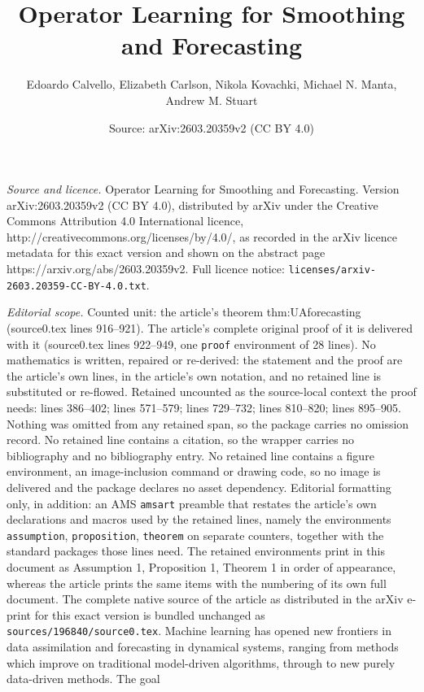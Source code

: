 \documentclass[10pt,a4paper]{amsart}
\title{Operator Learning for Smoothing and Forecasting}
\author{Edoardo Calvello, Elizabeth Carlson, Nikola Kovachki, Michael N. Manta, Andrew M. Stuart}
\date{Source: arXiv:2603.20359v2 (CC BY 4.0)}
\begin{document}
\maketitle

\noindent\emph{Source and licence.} Operator Learning for Smoothing and Forecasting. Version arXiv:2603.20359v2 (CC BY 4.0), distributed by arXiv under the Creative Commons Attribution 4.0 International licence, http://creativecommons.org/licenses/by/4.0/, as recorded in the arXiv licence metadata for this exact version and shown on the abstract page https://arxiv.org/abs/2603.20359v2. Full licence notice: \texttt{licenses/arxiv-2603.20359-CC-BY-4.0.txt}.\par\smallskip

\noindent\textit{Editorial scope.} Counted unit: the article's theorem thm:UAforecasting (source0.tex lines 916--921). The article's complete original proof of it is delivered with it (source0.tex lines 922--949, one \texttt{proof} environment of 28 lines). No mathematics is written, repaired or re-derived: the statement and the proof are the article's own lines, in the article's own notation, and no retained line is substituted or re-flowed.  Retained uncounted as the source-local context the proof needs: lines 386--402; lines 571--579; lines 729--732; lines 810--820; lines 895--905.  Nothing was omitted from any retained span, so the package carries no omission record.  No retained line contains a citation, so the wrapper carries no bibliography and no bibliography entry.  No retained line contains a figure environment, an image-inclusion command or drawing code, so no image is delivered and the package declares no asset dependency.  Editorial formatting only, in addition: an AMS \texttt{amsart} preamble that restates the article's own declarations and macros used by the retained lines, namely the environments \texttt{assumption}, \texttt{proposition}, \texttt{theorem} on separate counters, together with the standard packages those lines need.  The retained environments print in this document as Assumption 1, Proposition 1, Theorem 1 in order of appearance, whereas the article prints the same items with the numbering of its own full document.  The complete native source of the article as distributed in the arXiv e-print for this exact version is bundled unchanged as \texttt{sources/196840/source0.tex}.
Machine learning has opened new frontiers in data assimilation and forecasting in dynamical systems,
ranging from methods which improve on traditional model-driven 
algorithms, through to new purely data-driven methods. The goal
\end{document}
